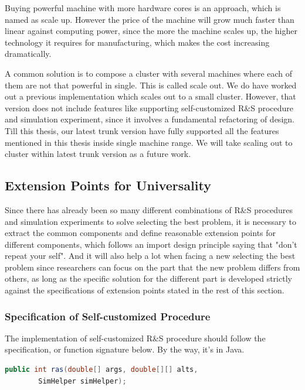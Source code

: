 \documentclass[12pt,a4paper]{report}
\begin{document}
Buying powerful machine with more hardware cores is an approach, which is named as scale up. However the price of the machine will grow much faster than linear against computing power, since the more the machine scales up, the higher technology it requires for manufacturing, which makes the cost increasing dramatically.

A common solution is to compose a cluster with several machines where each of them are not that powerful in single. This is called scale out. We do have worked out a previous implementation which scales out to a small cluster. However, that version does not include features like supporting self-customized R\&S procedure and simulation experiment, since it involves a fundamental refactoring of design. Till this thesis, our latest trunk version have fully supported all the features mentioned in this thesis inside single machine range. We will take scaling out to cluster within latest trunk version as a future work.

\subsection{Extension Points for Universality}

Since there has already been so many different combinations of R\&S procedures and simulation experiments to solve selecting the best problem, it is necessary to extract the common components and define reasonable extension points for different components, which follows an import design principle saying that "don't repeat your self". And it will also help a lot when facing a new selecting the best problem since researchers can focus on the part that the new problem differs from others, as long as the specific solution for the different part is developed strictly against the specifications of extension points stated in the rest of this section.

\subsubsection{Specification of Self-customized Procedure}

The implementation of self-customized R\&S procedure should follow the specification, or function signature below. By the way, it's in Java.

\begin{lstlisting}[language=Java]
public int ras(double[] args, double[][] alts,
        SimHelper simHelper);
\end{lstlisting}
\end{document}
